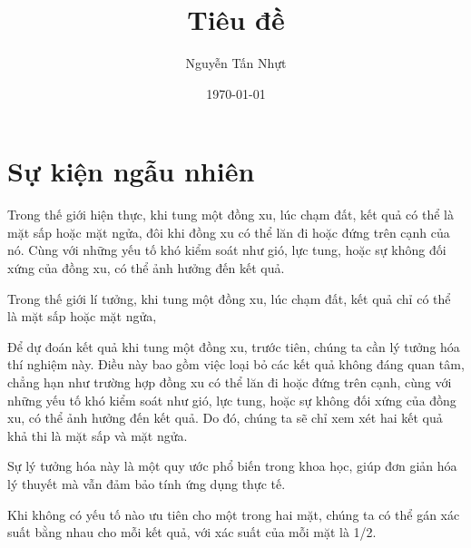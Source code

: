 \documentclass[12pt]{article} %
\title{Tiêu đề}
\author{Nguyễn Tấn Nhựt}
\date{\today}
\begin{document}
\maketitle

\section{Sự kiện ngẫu nhiên}



Trong thế giới hiện thực, khi tung một đồng xu, lúc chạm đất, kết quả có thể là mặt sấp hoặc mặt ngửa, đôi khi đồng xu có thể lăn đi hoặc đứng trên cạnh của nó. Cùng với những yếu tố khó kiểm soát như gió, lực tung, hoặc sự không đối xứng của đồng xu, có thể ảnh hưởng đến kết quả.

Trong thế giới lí tưởng, khi tung một đồng xu, lúc chạm đất, kết quả chỉ có thể là mặt sấp hoặc mặt ngửa, 

Để dự đoán kết quả khi tung một đồng xu, trước tiên, chúng ta cần lý tưởng hóa thí nghiệm này. Điều này bao gồm việc loại bỏ các kết quả không đáng quan tâm, chẳng hạn như trường hợp đồng xu có thể lăn đi hoặc đứng trên cạnh, cùng với những yếu tố khó kiểm soát như gió, lực tung, hoặc sự không đối xứng của đồng xu, có thể ảnh hưởng đến kết quả. Do đó, chúng ta sẽ chỉ xem xét hai kết quả khả thi là mặt sấp và mặt ngửa.

Sự lý tưởng hóa này là một quy ước phổ biến trong khoa học, giúp đơn giản hóa lý thuyết mà vẫn đảm bảo tính ứng dụng thực tế.  

Khi không có yếu tố nào ưu tiên cho một trong hai mặt, chúng ta có thể gán xác suất bằng nhau cho mỗi kết quả, với xác suất của mỗi mặt là 1/2.
\end{document}
